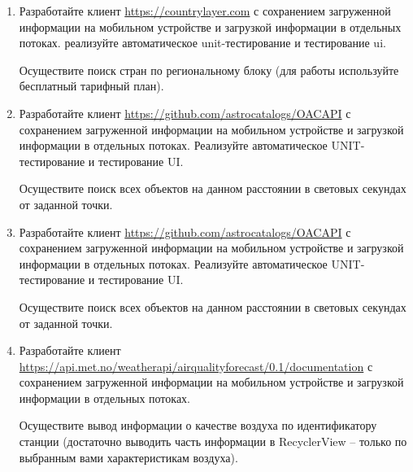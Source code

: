 \begin{enumerate}
	\item Разработайте клиент \url{https://countrylayer.com} с сохранением загруженной информации на мобильном устройстве и загрузкой
		информации в отдельных потоках. реализуйте автоматическое unit-тестирование и тестирование ui.

		Осуществите поиск стран по региональному блоку (для работы используйте бесплатный тарифный план).

 	\item Разработайте клиент \url{https://github.com/astrocatalogs/OACAPI} с сохранением загруженной информации на мобильном устройстве и загрузкой
		информации в отдельных потоках. Реализуйте автоматическое UNIT-тестирование и тестирование UI.

		Осуществите поиск всех объектов на данном расстоянии в световых секундах от заданной точки.

  	\item Разработайте клиент \url{https://github.com/astrocatalogs/OACAPI} с сохранением загруженной информации на мобильном устройстве и загрузкой
		информации в отдельных потоках. Реализуйте автоматическое UNIT-тестирование и тестирование UI.

		Осуществите поиск всех объектов на данном расстоянии в световых секундах от заданной точки.

 	







	\item Разработайте клиент \url{https://api.met.no/weatherapi/airqualityforecast/0.1/documentation} с сохранением загруженной информации на мобильном устройстве и загрузкой
		информации в отдельных потоках. 

		Осуществите вывод информации о качестве воздуха по идентификатору станции (достаточно выводить часть информации в RecyclerView -- только
		по выбранным вами характеристикам воздуха).







\end{enumerate}
